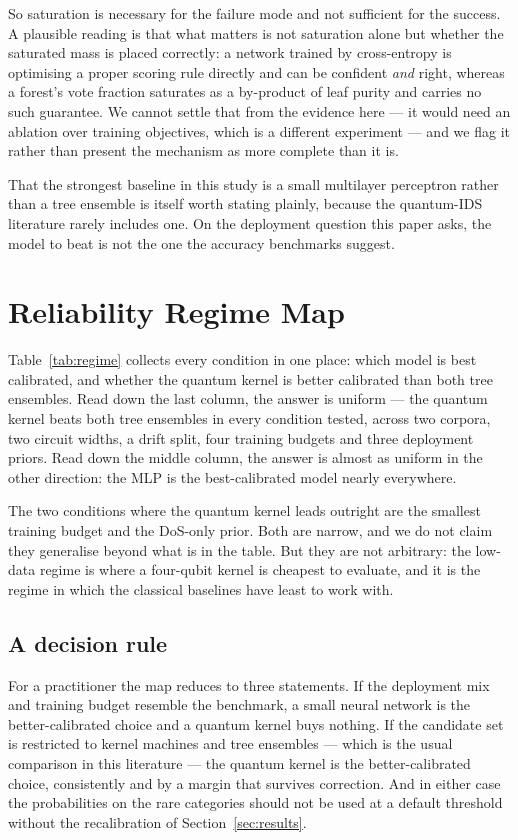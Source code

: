 \documentclass[journal]{IEEEtran}
\begin{document}
So saturation is necessary for the failure mode and not sufficient for the
success. A plausible reading is that what matters is not saturation alone
but whether the saturated mass is placed correctly: a network trained by
cross-entropy is optimising a proper scoring rule directly and can be
confident \emph{and} right, whereas a forest's vote fraction saturates as a
by-product of leaf purity and carries no such guarantee. We cannot settle
that from the evidence here --- it would need an ablation over training
objectives, which is a different experiment --- and we flag it rather than
present the mechanism as more complete than it is.

That the strongest baseline in this study is a small multilayer perceptron
rather than a tree ensemble is itself worth stating plainly, because the
quantum-IDS literature rarely includes one. On the deployment question this
paper asks, the model to beat is not the one the accuracy benchmarks
suggest.

\section{Reliability Regime Map}\label{sec:regime}



Table~\ref{tab:regime} collects every condition in one place: which model is
best calibrated, and whether the quantum kernel is better calibrated than
both tree ensembles. Read down the last column, the answer is uniform ---
the quantum kernel beats both tree ensembles in every condition tested,
across two corpora, two circuit widths, a drift split, four training
budgets and three deployment priors. Read down the middle column, the
answer is almost as uniform in the other direction: the MLP is the
best-calibrated model nearly everywhere.

The two conditions where the quantum kernel leads outright are the smallest
training budget and the DoS-only prior. Both are narrow, and we do not
claim they generalise beyond what is in the table. But they are not
arbitrary: the low-data regime is where a four-qubit kernel is cheapest to
evaluate, and it is the regime in which the classical baselines have least
to work with.

\subsection*{A decision rule}
For a practitioner the map reduces to three statements. If the deployment
mix and training budget resemble the benchmark, a small neural network is
the better-calibrated choice and a quantum kernel buys nothing. If the
candidate set is restricted to kernel machines and tree ensembles --- which
is the usual comparison in this literature --- the quantum kernel is the
better-calibrated choice, consistently and by a margin that survives
correction. And in either case the probabilities on the rare categories
should not be used at a default threshold without the recalibration of
Section~\ref{sec:results}.
\end{document}
